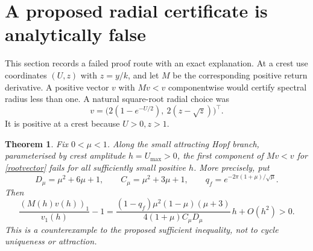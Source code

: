 \documentclass[11pt,a4paper]{article}
\newtheorem{theorem}{Theorem}[section]\newtheorem{lemma}[theorem]{Lemma}
\theoremstyle{remark}\newtheorem{remark}[theorem]{Remark}
\begin{document}
\section{A proposed radial certificate is analytically false}
This section records a failed proof route with an exact explanation. At a crest use coordinates $(U,z)$ with $z=y/k$, and let $M$ be the corresponding positive return derivative. A positive vector $v$ with $Mv<v$ componentwise would certify spectral radius less than one. A natural square-root radial choice was
\begin{equation}\label{rootvector}
 v=\bigl(2(1-e^{-U/2}),\ 2(z-\sqrt z)\bigr)^\top.
\end{equation}
It is positive at a crest because $U>0,z>1$.

\begin{theorem}\label{falsecertificate}
Fix $0<\mu<1$. Along the small attracting Hopf branch, parameterised by crest amplitude $h=U_{\max}>0$, the first component of $Mv<v$ for \eqref{rootvector} fails for all sufficiently small positive $h$. More precisely, put
\[
 D_\mu=\mu^2+6\mu+1,\qquad C_\mu=\mu^2+3\mu+1,\qquad
 q_f=e^{-2\pi(1+\mu)/\sqrt\mu}.
\]
Then
\begin{equation}\label{falsecoefficient}
 \frac{(M(h)v(h))_1}{v_1(h)}-1
 =\frac{(1-q_f)\mu^2(1-\mu)(\mu+3)}{4(1+\mu)C_\mu D_\mu}\,h+O(h^2)>0.
\end{equation}
This is a counterexample to the proposed sufficient inequality, not to cycle uniqueness or attraction.
\end{theorem}
\end{document}
